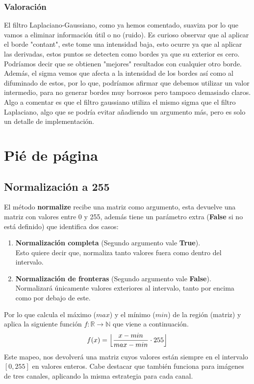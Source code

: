 \documentclass{article}
\begin{document}
\newpage

\subsubsection{Valoración}
El filtro Laplaciano-Gaussiano, como ya hemos comentado, suaviza por lo que vamos a eliminar información útil o no (ruido).
\newline
\newline
Es curioso observar que al aplicar el borde "contant", este tome una intensidad baja, esto ocurre ya que al aplicar las derivadas, estos puntos se detecten como bordes ya que su exterior es cero. Podríamos decir que se obtienen "mejores" resultados con cualquier otro borde.
\newline
\newline
Además, el sigma vemos que afecta a la intensidad de los bordes así como al difuminado de estos, por lo que, podríamos afirmar que debemos utilizar un valor intermedio, para no generar bordes muy borrosos pero tampoco demasiado claros.
\newline
\newline
Algo a comentar es que el filtro gaussiano utiliza el mismo sigma que el filtro Laplaciano, algo que se podría evitar añadiendo un argumento más, pero es solo un detalle de implementación.

\newpage

\section{Pié de página}

\subsection{Normalización a 255}
El método \textbf{normalize} recibe una matriz como argumento, esta devuelve una matriz con valores entre 0 y 255, además tiene un parámetro extra (\textbf{False} si no está definido) que identifica dos casos:
\begin{enumerate}
	\item \textbf{Normalización completa} (Segundo argumento vale \textbf{True}).\\ Esto quiere decir que, normaliza tanto valores fuera como dentro del intervalo.
	\item \textbf{Normalización de fronteras} (Segundo argumento vale \textbf{False}). \\ Normalizará únicamente valores exteriores al intervalo, tanto por encima como por debajo de este.
\end{enumerate}
Por lo que calcula el máximo ($max$) y el mínimo ($min$) de la región (matriz) y aplica la siguiente función $f:\mathbb{R} \to \mathbb{N}$ que viene a continuación.
$$ f(x) = \Bigl\lfloor\dfrac{x - min}{max - min} \cdot 255\Bigr\rfloor$$
Este mapeo, nos devolverá una matriz cuyos valores están siempre en el intervalo $\left[0, 255\right]$ en valores enteros.
Cabe destacar que también funciona para imágenes de tres canales, aplicando la misma estrategia para cada canal.
\end{document}
